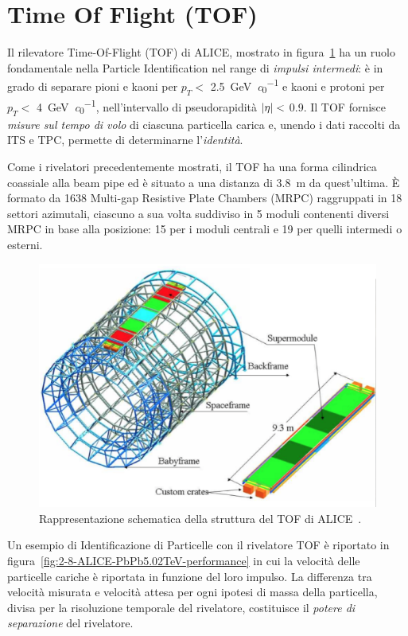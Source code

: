 
\section{Time Of Flight (TOF)}
\label{sec:2-TOF}
    Il rilevatore Time-Of-Flight (TOF) di ALICE, mostrato in figura~\ref{fig:2-7-ALICE-TOF} ha un ruolo fondamentale nella Particle Identification nel range di \textit{impulsi intermedi}: è in grado di separare pioni e kaoni per $p_{T} <$ \qty[per-mode = symbol]{2.5}{\giga \eV \per \clight} e kaoni e protoni per $p_{T} <$ \qty[per-mode = symbol]{4}{\giga \eV \per \clight}, nell’intervallo di pseudorapidità $\abs{\eta} <$ \num{0.9}. Il TOF fornisce \textit{misure sul tempo di volo} di ciascuna particella carica e, unendo i dati raccolti da ITS e TPC, permette di determinarne l’\textit{identità}.
    
    Come i rivelatori precedentemente mostrati, il TOF ha una forma cilindrica coassiale alla beam pipe ed è situato a una distanza di \qty{3.8}{\meter} da quest’ultima. È formato da 1638 Multi-gap Resistive Plate Chambers (MRPC) raggruppati in 18 settori azimutali, ciascuno a sua volta suddiviso in 5 moduli contenenti diversi MRPC in base alla posizione: 15 per i moduli centrali e 19 per quelli intermedi o esterni.

    \begin{figure}[h]
        \centering
        \includegraphics[width=0.7\linewidth]{res/fig/2-chapter/7-ALICE-TOF.eps}
        \caption{Rappresentazione schematica della struttura del TOF di ALICE~\cite{}.}
        \label{fig:2-7-ALICE-TOF}
    \end{figure}

    Un esempio di Identificazione di Particelle con il rivelatore TOF è riportato in figura~\ref{fig:2-8-ALICE-PbPb5.02TeV-performance} in cui la velocità delle particelle cariche è riportata in funzione del loro impulso. La differenza tra velocità misurata e velocità attesa per ogni ipotesi di massa della particella, divisa per la risoluzione temporale del rivelatore, costituisce il \textit{potere di separazione} del rivelatore.

